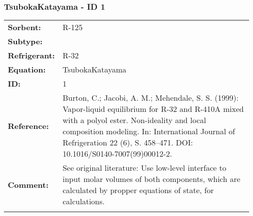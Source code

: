 \FloatBarrier
\newpage
\subsubsection{TsubokaKatayama - ID 1}
%
\begin{tabular}[l]{|lp{11.5cm}|}
\hline
\addlinespace

\textbf{Sorbent:} & R-125 \\
\textbf{Subtype:} &  \\
\textbf{Refrigerant:} & R-32 \\
\textbf{Equation:} & TsubokaKatayama \\
\textbf{ID:} & 1 \\
\textbf{Reference:} & Burton, C.; Jacobi, A. M.; Mehendale, S. S. (1999): Vapor-liquid equilibrium for R-32 and R-410A mixed with a polyol ester. Non-ideality and local composition modeling. In: International Journal of Refrigeration 22 (6), S. 458–471. DOI: 10.1016/S0140-7007(99)00012-2. \\
\textbf{Comment:} & See original literature: Use low-level interface to input molar volumes of both components, which are calculated by propper equations of state, for calculations. \\

\addlinespace
\hline
\end{tabular}
\newline

